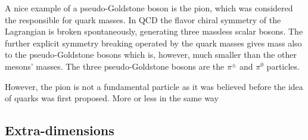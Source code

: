 A nice example of a pseudo-Goldstone boson is the pion,
which was considered the responsible for quark masses. 
In QCD the flavor chiral symmetry of the Lagrangian is 
broken spontaneously, generating three
massless scalar bosons. The further explicit symmetry breaking
operated by the quark masses gives mass also to the 
pseudo-Goldstone bosons which is, however, much smaller than
the other mesons' masses. The three pseudo-Goldstone bosons 
are the $\pi^{\pm}$ and $\pi^0$ particles. %

However, the pion is not a fundamental particle as
it was believed before the idea of quarks was first
proposed. More or less in the same way




\begin{figure}[htb]\begin{center}
\label{fig:susyloops}\end{center}\end{figure}

\subsection{Extra-dimensions}\label{sec:extradimensions}

